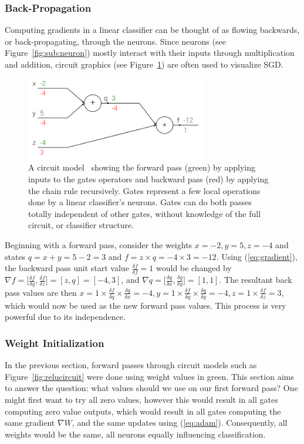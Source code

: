 \subsubsection{Back-Propagation}
Computing gradients in a linear classifier can be thought of as flowing backwards, or back-propagating, through the neurons. Since neurons (see Figure~\ref{fig:sub:neuron}) mostly interact with their inputs through multiplication and addition, circuit graphics (see Figure~\ref{fig:backprop}) are often used to visualize SGD.
\begin{figure}[ht!]
	\centering \includegraphics[width=0.7\textwidth,keepaspectratio]{figs/backprog.png}
    \caption{A circuit model~\cite{cs231} showing the forward pass (green) by applying inputs to the gates operators and backward pass (red) by applying the chain rule recursively. Gates represent a few local operations done by a linear classifier's neurons. Gates can do both passes totally independent of other gates, without knowledge of the full circuit, or classifier structure.}
\label{fig:backprop}
\end{figure}
Beginning with a forward pass, consider the weights $x=-2, y=5, z=-4$ and states $q=x+y=5-2=3$ and $f=z\times q = -4 \times 3=-12$. Using (\ref{eq:gradient}), the backward pass unit start value $\frac{\delta f}{\delta f}=1$ would be changed by $\nabla f = \big[ \frac{\delta f}{\delta q} , \frac{\delta f}{\delta z} \big] = [ z, q ] = [ -4, 3 ]$, and $\nabla q = \big[ \frac{\delta q}{\delta x} , \frac{\delta q}{\delta y} \big] = [ 1, 1 ]$. The resultant back pass values are then $x = 1 \times \frac{\delta f}{\delta q} \times \frac{\delta q}{\delta x} = -4, y = 1 \times \frac{\delta f}{\delta q} \times \frac{\delta q}{\delta y} = -4, z = 1 \times \frac{\delta f}{\delta z} = 3$, which would now be used as the new forward pass values. This process is very powerful due to its independence.

\subsubsection{Weight Initialization}
In the previous section, forward passes through circuit models such as Figure~\ref{fig:relucircuit} were done using weight values in green. This section aims to answer the question: what values should we use on our first forward pass? One might first want to try all zero values, however this would result in all gates computing zero value outputs, which would result in all gates computing the same gradient $\nabla W$, and the same updates using (\ref{eq:adam}). Consequently, all weights would be the same, all neurons equally influencing classification.

